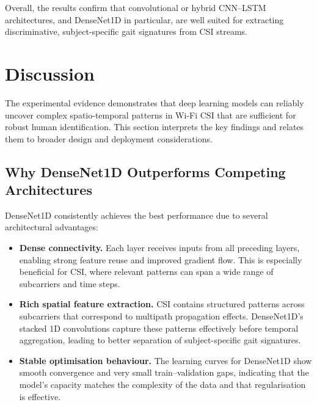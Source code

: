Overall, the results confirm that convolutional or hybrid CNN--LSTM
architectures, and DenseNet1D in particular, are well suited for
extracting discriminative, subject-specific gait signatures from CSI
streams.

\section{Discussion}
\label{sec:discussion}

The experimental evidence demonstrates that deep learning models can
reliably uncover complex spatio-temporal patterns in Wi-Fi CSI that are
sufficient for robust human identification. This section interprets the
key findings and relates them to broader design and deployment
considerations.

\subsection{Why DenseNet1D Outperforms Competing Architectures}

DenseNet1D consistently achieves the best performance due to several
architectural advantages:

\begin{itemize}
    \item \textbf{Dense connectivity.} Each layer receives inputs from all
    preceding layers, enabling strong feature reuse and improved gradient
    flow. This is especially beneficial for CSI, where relevant patterns
    can span a wide range of subcarriers and time steps.

    \item \textbf{Rich spatial feature extraction.} CSI contains structured
    patterns across subcarriers that correspond to multipath propagation
    effects. DenseNet1D's stacked 1D convolutions capture these patterns
    effectively before temporal aggregation, leading to better separation
    of subject-specific gait signatures.

    \item \textbf{Stable optimisation behaviour.} The learning curves for
    DenseNet1D show smooth convergence and very small train--validation
    gaps, indicating that the model's capacity matches the complexity of
    the data and that regularisation is effective.
\end{itemize}

